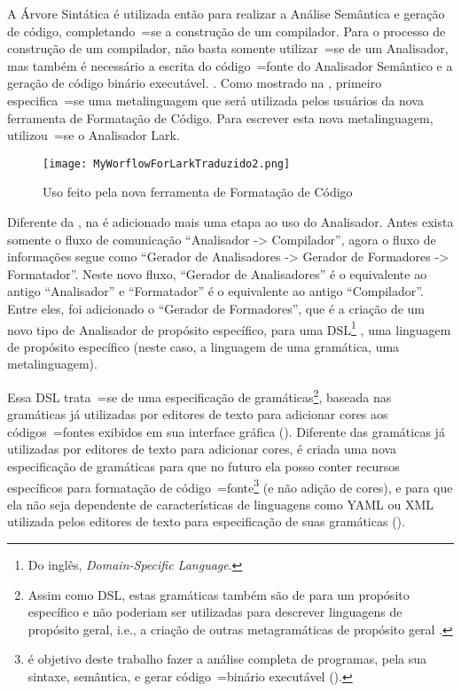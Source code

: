 A Árvore Sintática é utilizada então para realizar a Análise Semântica e
geração de código,
completando~=se a construção de um compilador.
Para o processo de construção de um compilador,
não basta somente utilizar~=se de um Analisador,
mas também é necessário a escrita do código~=fonte do Analisador Semântico e
a geração de código binário executável.
.
Como mostrado na ,
primeiro especifica~=se uma metalinguagem que será utilizada pelos usuários da nova ferramenta de Formatação de Código.
Para escrever esta nova metalinguagem,
utilizou~=se o Analisador Lark.
\begin{figure}[!htb]
\caption{Uso feito pela nova ferramenta de Formatação de Código}
\label{figure:MyWorflowForLarkTraduzido2}
\centering
\texttt{[image: MyWorflowForLarkTraduzido2.png]}
\end{figure}

Diferente da ,
na  é adicionado mais uma etapa ao uso do Analisador.
Antes exista somente o fluxo de comunicação ``Analisador -> Compilador'',
agora o fluxo de informações segue como ``Gerador de Analisadores -> Gerador de Formadores -> Formatador''.
Neste novo fluxo,
``Gerador de Analisadores'' é o equivalente ao antigo ``Analisador'' e
``Formatador'' é o equivalente ao antigo ``Compilador''.
Entre eles,
foi adicionado o ``Gerador de Formadores'',
que é a criação de um novo tipo de Analisador de propósito específico,
para uma DSL\footnote{%
Do inglês,
\textit{Domain-Specific Language}.
} \cite{areThereDomainSpecificLanguages,yamlSpecificModelChecking},
uma linguagem de propósito específico (neste caso,
a linguagem de uma gramática,
uma metalinguagem).

Essa DSL trata~=se de uma especificação de gramáticas\footnote{
Assim como DSL\s,
estas gramáticas também são de para um propósito específico e
não poderiam ser utilizadas para descrever linguagens de propósito geral,
i.e.,
a criação de outras metagramáticas de propósito geral \cite{turingCompleteRegularLanguages}.
},
baseada nas gramáticas já utilizadas por editores de texto para adicionar cores aos códigos~=fontes exibidos em sua interface gráfica ().
Diferente das gramáticas já utilizadas por editores de texto para adicionar cores,
é criada uma nova especificação de gramáticas para que no futuro ela posso conter recursos específicos para formatação de código~=fonte\footnote{
 é objetivo deste trabalho fazer a análise completa de programas,
pela sua sintaxe, semântica,
e gerar código~=binário executável ().
}
(e não adição de cores),
e para que ela não seja dependente de características de linguagens como YAML ou
XML utilizada pelos editores de texto para especificação de suas gramáticas ().

